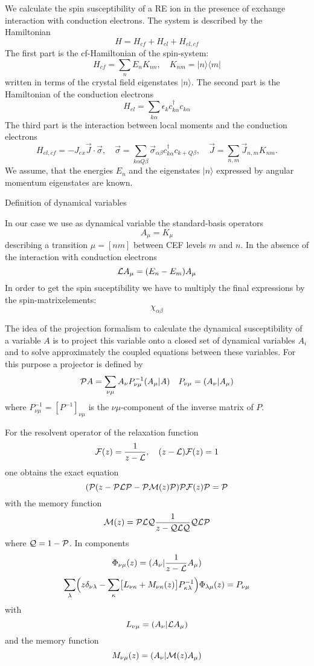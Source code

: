We calculate the spin susceptibility of a RE ion in the presence of exchange
interaction with conduction electrons. The system is described by the
Hamiltonian
$$
H=H_{cf}+H_{el}+H_{el,cf} 
$$
The first part is the cf-Hamiltonian of the spin-system: 
$$ 
H_{cf}= \sum_n E_n K_{nn}, \quad K_{nm}= \vert n\rangle \langle m\vert
$$  
written in terms of the crystal field eigenstates $\vert n\rangle$. 
The second part is the Hamiltonian of the conduction electrons
$$
H_{el}=\sum_{k\alpha}\epsilon_kc^\dagger_{k\alpha}c_{k\alpha}
$$
The third part is the 
 interaction between local moments and  the conduction electrons
$$
H_{el,cf}= - J_{ex}\vec J \cdot \vec \sigma, \quad \vec \sigma = \sum_{k\alpha
Q\beta}\vec \sigma_{\alpha\beta}c^\dagger_{k\alpha}c_{k+Q\beta}, \quad \vec
J=\sum_{n,m}\vec J_{n,m}K_{nm}.
$$
We assume, that the energies $E_n$ and the eigenstates $\vert n\rangle$
expressed by angular momentum eigenstates are known.

\bigskip
\noindent
Definition of dynamical variables

In our case we use as dynamical variable the standard-basis operators
$$
A_\mu= K_{\mu}
$$
 describing a  transition $\mu= [nm]$ between CEF levels $m$ and $n$. 
In the absence of the interaction with conduction electrons
$$
{\cal L}A_\mu = (E_n-E_m)A_\mu
$$
In order to
get the spin suceptibility we have to multiply the final expressions by the
spin-matrixelements:
$$ 
\chi_{\alpha \beta}   
$$

The idea of the projection formalism to calculate the dynamical
susceptibility of a variable $A$ is to project this variable  onto a closed
set of dynamical variables $A_i$ and to solve approximately the coupled
equations between these variables. For this purpose a projector is defined
by
$$
{\cal P} A= \sum_{\nu \mu}A_\nu P^{-1}_{\nu \mu}(A_\mu\vert A) \quad
P_{\nu\mu}=(A_\nu\vert A_\mu)
$$ 
where $ P^{-1}_{\nu \mu}=[P^{-1}]_{\nu \mu}$ is the ${\nu\mu}$-component of the inverse matrix of
$P$. 

For the  resolvent operator of the relaxation function
$$
{\cal F}(z)= {1\over {z-\cal L}}, \quad ({z-\cal L}){\cal F}(z)=1 
$$
one obtains the exact equation
$$
({\cal P}(z-{\cal P}{\cal L}{\cal P} - {\cal P} {\cal M}(z) {\cal P}){\cal P} {\cal
F}(z) {\cal P}= {\cal P}
$$
with the memory function
$$
{\cal M}(z)={\cal PLQ}{1\over z-{\cal QLQ} }{\cal QLP}
$$ 
where ${\cal Q}=1-{\cal P}$. In components
$$
\Phi_{\nu\mu}(z)= (A_\nu\vert {1\over z-{\cal L}} A_\mu)
$$
$$
\sum_\lambda \Bigl(z\delta_{\nu\lambda}-\sum_\kappa\bigl[L_{\nu\kappa}+
M_{\nu\kappa}(z)\bigr]P^{-1}_{\kappa\lambda}\Bigr)\Phi_{\lambda\mu}(z)
=P_{\nu \mu}
$$
with
$$
L_{\nu\mu}=(A_\nu\vert {\cal L}A_\mu)
$$
and the memory function 
$$
M_{\nu\mu}(z)=(A_\nu\vert{\cal M}(z)A_\mu)
$$

